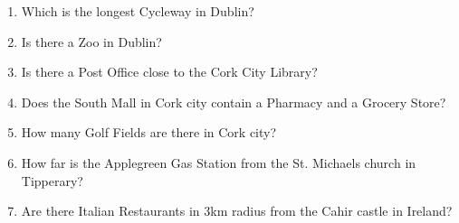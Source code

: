 \documentclass[12pt]{report}
\begin{document}
\begin{enumerate}
    \item Which is the longest Cycleway in Dublin?
    \item Is there a Zoo in Dublin?
    \item Is there a Post Office close to the Cork City Library?
    \item Does the South Mall in Cork city contain a Pharmacy and a Grocery Store?
    \item How many Golf Fields are there in Cork city?
    \item How far is the Applegreen Gas Station from the St. Michaels church in Tipperary?
    \item Are there Italian Restaurants in 3km radius from the Cahir castle in Ireland?
\end{enumerate}
    \clearpage
\end{document}
